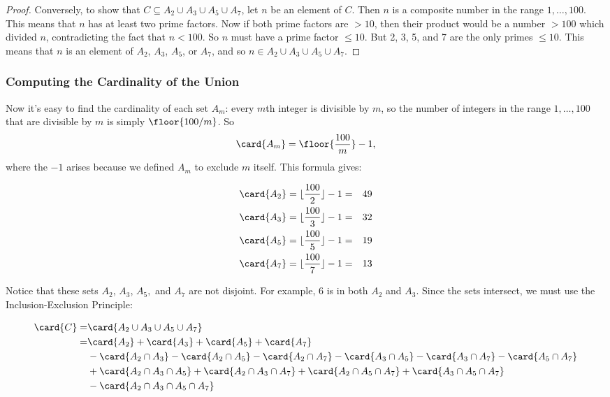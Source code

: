 \begin{editingnotes}
\begin{proof}
Conversely, to show that $C \subseteq A_2 \cup A_3 \cup A_5 \cup A_7$, let
$n$ be an element of $C$.  Then $n$ is a composite number in the range $1,
\dots, 100$.  This means that $n$ has at least two prime factors.  Now if
both prime factors are $> 10$, then their product would be a number $>
100$ which divided $n$, contradicting the fact that $n<100$.  So $n$ must
have a prime factor $\leq 10$.  But 2, 3, 5, and 7 are the only primes
$\leq 10$.  This means that $n$ is an element of $A_2$, $A_3$, $A_5$, or
$A_7$, and so $n \in A_2 \cup A_3 \cup A_5 \cup A_7$.
\end{proof}

\subsubsection{Computing the Cardinality of the Union}

Now it's easy to find the cardinality of each set $A_m$: every $m$th
integer is divisible by $m$, so the number of integers in the range $1,
\dots, 100$ that are divisible by $m$ is simply $\floor{100/m}$.  So
\[
\card{A_m} = \floor{\frac{100}{m}} - 1,
\]
where the $-1$ arises because we defined $A_m$ to exclude $m$ itself.
This formula gives:

\begin{eqnarray*}
\card{A_2} & = \lfloor\frac{100}{2}\rfloor - 1 = & 49 \\
\card{A_3} & = \lfloor\frac{100}{3}\rfloor - 1 = & 32 \\
\card{A_5} & = \lfloor\frac{100}{5}\rfloor - 1 = & 19 \\
\card{A_7} & = \lfloor\frac{100}{7}\rfloor - 1 = & 13
\end{eqnarray*}

Notice that these sets $A_2$, $A_3$, $A_5,$ and $A_7$ are not disjoint.
For example, 6 is in both $A_2$ and $A_3$.  Since the sets intersect, we
must use the Inclusion-Exclusion Principle:

\begin{align*}
\card{C}
  = & \card{A_2 \cup A_3 \cup A_5 \cup A_7} \\
  = & \card{A_2} + \card{A_3} + \card{A_5} + \card{A_7} \\
    & - \card{A_2 \cap A_3} - \card{A_2 \cap A_5} - \card{A_2 \cap A_7}
             - \card{A_3 \cap A_5} - \card{A_3 \cap A_7} - \card{A_5 \cap A_7} \\
    & + \card{A_2 \cap A_3 \cap A_5} + \card{A_2 \cap A_3 \cap A_7}
             + \card{A_2 \cap A_5 \cap A_7} + \card{A_3 \cap A_5 \cap A_7} \\
    & - \card{A_2 \cap A_3 \cap A_5 \cap A_7}
\end{align*}


\end{editingnotes}

